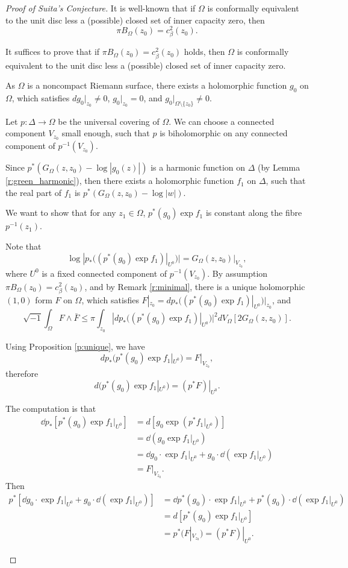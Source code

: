 \begin{proof}[Proof of Suita's Conjecture]
  It is well-known that if $\Omega$ is conformally equivalent to the unit disc less
a (possible) closed set of inner capacity zero,
then
$$\pi B_{\Omega}(z_{0})= c^{2}_{\beta}(z_{0}).$$

It suffices to prove that if $\pi B_{\Omega}(z_{0})= c^{2}_{\beta}(z_{0})$ holds,
then $\Omega$ is conformally equivalent to the unit disc less
a (possible) closed set of inner capacity zero.

As $\Omega$ is a noncompact Riemann surface,
there exists a holomorphic function $g_{0}$ on $\Omega$,
which satisfies $dg_{0}|_{z_{0}}\neq 0$, $g_{0}|_{z_{0}}=0$,
and $g_{0}|_{\Omega\setminus \{z_{0}\}}\neq 0$.

Let $p:\Delta\to \Omega$ be the universal covering of $\Omega$. We
can choose a connected component $V_{z_{0}}$ small enough, such that
$p$ is biholomorphic on any connected component of
$p^{-1}(V_{z_{0}})$.

Since $p^{*}(G_{\Omega}(z,z_{0})-\log|g_{0}(z)|)$ is a harmonic function on
$\Delta$ (by Lemma \ref{r:green_harmonic}),
then there exists a holomorphic function $f_{1}$ on
$\Delta$,
such that the real part of $f_{1}$ is $p^{*}(G_{\Omega}(z,z_{0})-\log|w|)$.

We want to show that for any $z_{1}\in\Omega$,
$p^{*}(g_{0})\exp f_{1}$ is constant along the fibre $p^{-1}(z_{1})$.

Note that
$$\log|p_{*}((p^{*}(g_{0})\exp f_{1})|_{U^{0}})|=G_{\Omega}(z,z_{0})|_{V_{z_{0}}},$$
where $U^{0}$ is a fixed connected component of $p^{-1}(V_{z_{0}})$.
By assumption $\pi B_{\Omega}(z_{0})= c^{2}_{\beta}(z_{0})$, and by
Remark \ref{r:minimal}, there is a unique holomorphic $(1,0)$ form
$F$ on $\Omega$, which satisfies
$F|_{z_{0}}=dp_{*}((p^{*}(g_{0})\exp f_{1})|_{U^{0}})|_{z_{0}}$, and
$$\sqrt{-1}\int_{\Omega}F\wedge\bar{F}\leq\pi\int_{z_{0}}|dp_{*}
((p^{*}(g_{0})\exp f_{1})|_{U^{0}})|^{2}dV_{\Omega}[2 G_{\Omega}(z,z_{0})].$$

Using Proposition \ref{p:unique}, we have
$$dp_{*}(p^{*}(g_{0})\exp
f_{1}|_{U^{0}})=F|_{V_{z_0}},$$
therefore
$$d(p^{*}(g_{0})\exp
f_{1}|_{U^{0}})=(p^{*}F)|_{U^{0}}.$$
\begin{remark}
  The computation is that 
  \begin{align*}
    \dd p_* [p^*(g_0) \exp f_1|_{U^0}] &=d [g_{0}  \exp (p^* f_1|_{U^0})]\\
    &=\dd (g_0 \exp f_1|_{U^0})\\ 
    &=\dd g_0\cdot \exp f_1|_{U^0}+g_0\cdot \dd (\exp f_1|_{U^0})\\ 
    &=F|_{V_{z_0}}.
  \end{align*}
    Then 
    \begin{align*}
      p^*[\dd g_0\cdot \exp f_1|_{U^0}+g_0\cdot \dd (\exp f_1|_{U^0})]
      &=\dd p^*(g_0)\cdot \exp f_1|_{U^0}+p^*(g_0)\cdot \dd (\exp f_1|_{U^0})\\
      &=d[p^*(g_0) \exp f_1|_{U^0}]\\
      &=p^* (F|_{V_{z_0}})=(p^*F)|_{U^0}.
    \end{align*}


\end{remark}
\end{proof}
